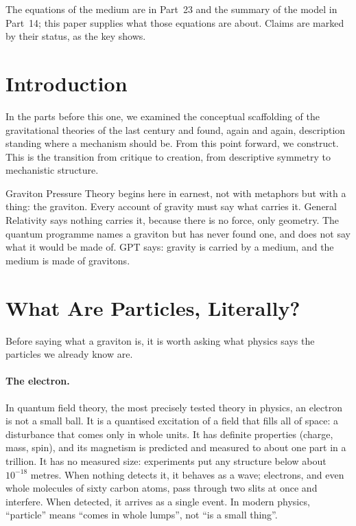 \documentclass[11pt,a4paper]{article}
\begin{document}
The equations of the medium are in Part~23 and the summary of the model in Part~14; this paper supplies what those equations are about. Claims are marked by their status, as the key shows.

\statuskey

\section*{Introduction}

In the parts before this one, we examined the conceptual scaffolding of the gravitational theories of the last century and found, again and again, description standing where a mechanism should be. From this point forward, we construct. This is the transition from critique to creation, from descriptive symmetry to mechanistic structure.

Graviton Pressure Theory begins here in earnest, not with metaphors but with a thing: the graviton. Every account of gravity must say what carries it. General Relativity says nothing carries it, because there is no force, only geometry. The quantum programme names a graviton but has never found one, and does not say what it would be made of. GPT says: gravity is carried by a medium, and the medium is made of gravitons.

\section{What Are Particles, Literally?}
\label{sec:particles}

Before saying what a graviton is, it is worth asking what physics says the particles we already know are.

\paragraph{The electron.} In quantum field theory, the most precisely tested theory in physics, an electron is not a small ball. It is a quantised excitation of a field that fills all of space: a disturbance that comes only in whole units. It has definite properties (charge, mass, spin), and its magnetism is predicted and measured to about one part in a trillion. It has no measured size: experiments put any structure below about $10^{-18}$ metres. When nothing detects it, it behaves as a wave; electrons, and even whole molecules of sixty carbon atoms, pass through two slits at once and interfere. When detected, it arrives as a single event. In modern physics, ``particle'' means ``comes in whole lumps'', not ``is a small thing''.
\end{document}
